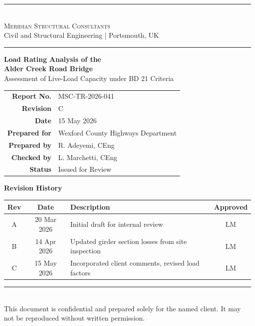 \documentclass[11pt]{article}
\begin{document}
\begin{titlepage}
\begin{center}

{\color{accent}\rule{\textwidth}{2.5pt}}\\[0.4em]
{\large\scshape Meridian Structural Consultants}\\
{\small Civil and Structural Engineering \quad | \quad Portsmouth, UK}\\[0.2em]
{\color{accent}\rule{\textwidth}{0.8pt}}

\vspace{3.2cm}

{\Huge\bfseries\color{accent} Load Rating Analysis of the\\[0.25em] Alder Creek Road Bridge}\\[1.2em]
{\large Assessment of Live-Load Capacity under BD 21 Criteria}

\vspace{1.6cm}

\begin{tabular}{r l}
\textbf{Report No.} & MSC-TR-2026-041 \\
\textbf{Revision} & C \\
\textbf{Date} & 15 May 2026 \\
\textbf{Prepared for} & Wexford County Highways Department \\
\textbf{Prepared by} & R. Adeyemi, CEng \\
\textbf{Checked by} & L. Marchetti, CEng \\
\textbf{Status} & Issued for Review \\
\end{tabular}

\vfill

\textbf{\color{accent} Revision History}\\[0.4em]
\begin{tabularx}{\textwidth}{c c X c}
\toprule
\textbf{Rev} & \textbf{Date} & \textbf{Description} & \textbf{Approved} \\
\midrule
A & 20 Mar 2026 & Initial draft for internal review & LM \\
B & 14 Apr 2026 & Updated girder section losses from site inspection & LM \\
C & 15 May 2026 & Incorporated client comments, revised load factors & LM \\
\bottomrule
\end{tabularx}

\vspace{1em}
{\color{accent}\rule{\textwidth}{0.8pt}}\\[0.3em]
{\small This document is confidential and prepared solely for the named client.
It may not be reproduced without written permission.}

\end{center}
\end{titlepage}
\end{document}

